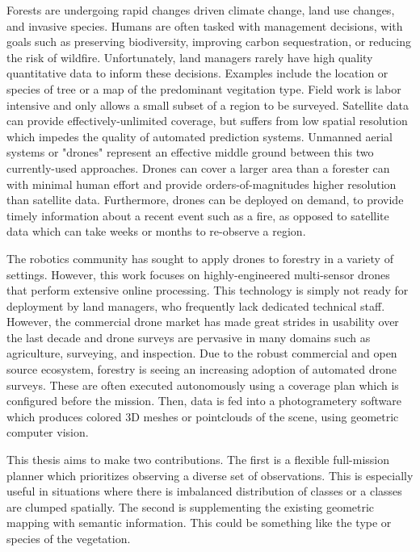 
\setlength{\parskip}{1em}
\setlength{\parindent}{0em}

Forests are undergoing rapid changes driven climate change, land use changes, and invasive species. Humans are often tasked with management decisions, with goals such as preserving biodiversity, improving carbon sequestration, or reducing the risk of wildfire. Unfortunately, land managers rarely have high quality quantitative data to inform these decisions. Examples include the location or species of tree or a map of the predominant vegitation type.
Field work is labor intensive and only allows a small subset of a region to be surveyed. Satellite data can provide effectively-unlimited coverage, but suffers from low spatial resolution which impedes the quality of automated prediction systems. Unmanned aerial systems or "drones" represent an effective middle ground between this two currently-used approaches. Drones can cover a larger area than a forester can with minimal human effort and provide orders-of-magnitudes higher resolution than satellite data. Furthermore, drones can be deployed on demand, to provide timely information about a recent event such as a fire, as opposed to satellite data which can take weeks or months to re-observe a region. 

The robotics community has sought to apply drones to forestry in a variety of settings. However, this work focuses on highly-engineered multi-sensor drones that perform extensive online processing. This technology is simply not ready for deployment by land managers, who frequently lack dedicated technical staff. However, the commercial drone market has made great strides in usability over the last decade and drone surveys are pervasive in many domains such as agriculture, surveying, and inspection. Due to the robust commercial and open source ecosystem, forestry is seeing an increasing adoption of automated drone surveys. These are often executed autonomously using a coverage plan which is configured before the mission. Then, data is fed into a photogrametery software which produces colored 3D meshes or pointclouds of the scene, using geometric computer vision. 

This thesis aims to make two contributions. The first is a flexible full-mission planner which prioritizes observing a diverse set of observations. This is especially useful in situations where there is imbalanced distribution of classes or a classes are clumped spatially. The second is supplementing the existing geometric mapping with semantic information. This could be something like the type or species of the vegetation.

\noindent